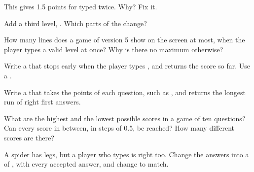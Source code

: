 \begin{exercise}[$\star\star$]\label{exo:g7:project-quiz-game:6}
This  gives 1.5 points for  typed twice. Why? Fix it.

\label{lst:g7:project-quiz-game:ask-bug}
\end{exercise}

\begin{exercise}[$\star\star$]\label{exo:g7:project-quiz-game:7}
Add a third level, . Which parts of the  change?
\end{exercise}

\begin{exercise}[$\star\star$]\label{exo:g7:project-quiz-game:8}
How many lines does a game of version 5 show on the screen at most, when the
player types a valid level at once? Why is there no maximum otherwise?
\end{exercise}

\begin{exercise}[$\star\star$]\label{exo:g7:project-quiz-game:9}
Write a  that stops early when the player types , and
returns the score so far. Use a  .
\end{exercise}

\begin{exercise}[$\star\star\star$]\label{exo:g7:project-quiz-game:10}
Write a   that takes the points of each
question, such as \code{[1, 0.5, 1, 1, 1, 0, 1, 1, 0.5, 1]}, and returns the
longest run of right first answers.
\end{exercise}

\begin{exercise}[$\star\star\star$]\label{exo:g7:project-quiz-game:11}
What are the highest and the lowest possible scores in a game of ten
questions? Can every score in between, in steps of 0.5, be reached? How many
different scores are there?
\end{exercise}

\begin{exercise}[$\star\star\star$]\label{exo:g7:project-quiz-game:12}
A spider has  legs, but a player who types  is right too.
Change the answers into a  of , with every accepted answer, and
change  to match.
\end{exercise}
